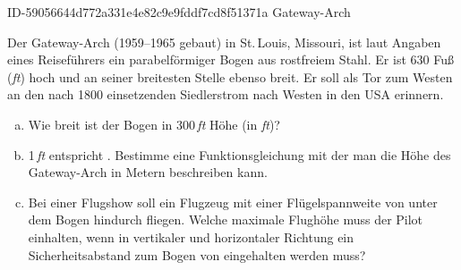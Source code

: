 \begin{exercise}
      {ID-59056644d772a331e4e82c9e9fddf7cd8f51371a}
      {Gateway-Arch}
  \ifproblem\problem\par
    Der Gateway-Arch (1959--1965 gebaut) in St.\,Louis, Missouri, ist laut
    Angaben eines Reiseführers ein parabelförmiger Bogen aus rostfreiem
    Stahl. Er ist 630 Fuß (\emph{ft}) hoch und an seiner breitesten Stelle
    ebenso breit. Er soll als \glqq{}Tor zum Westen\grqq{} an den nach 1800
    einsetzenden Siedlerstrom nach Westen in den USA erinnern.
    \begin{enumerate}[a)]
      \item Wie breit ist der Bogen in 300\,\emph{ft} Höhe (in \emph{ft})?
      \item 1\,\emph{ft} entspricht . Bestimme eine
            Funktionsgleichung mit der man die Höhe des Gateway-Arch in Metern
            beschreiben kann.
      \item Bei einer Flugshow soll ein Flugzeug mit einer Flügelspannweite
            von  unter dem Bogen hindurch fliegen. Welche maximale
            Flughöhe muss der Pilot einhalten, wenn in vertikaler und horizontaler
            Richtung ein Sicherheitsabstand zum Bogen von  eingehalten
            werden muss?
    \end{enumerate}
  \fi
\end{exercise}
